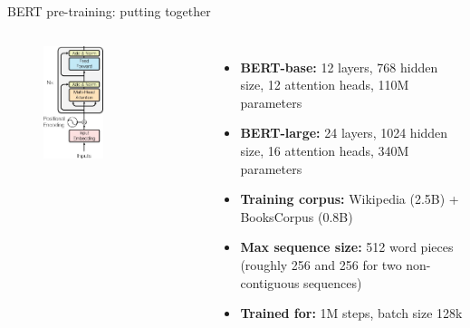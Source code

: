 \documentclass[serif, aspectratio=169]{beamer}
\begin{document}
\begin{frame}{BERT pre-training: putting together}
    \begin{columns}
        \begin{figure}[h]
            \centering
            \includegraphics[width=0.5\textwidth]{Figures/BERT.png}
        \end{figure}
        
        \begin{itemize}
            \item \textbf{BERT-base:} 12 layers, 768 hidden size, 12 attention heads, 110M parameters
            \vspace{0.3cm}
            \item \textbf{BERT-large:} 24 layers, 1024 hidden size, 16 attention heads, 340M parameters
            \vspace{0.3cm}
            \item \textbf{Training corpus:} Wikipedia (2.5B) + BooksCorpus (0.8B)
            \vspace{0.3cm}
            \item \textbf{Max sequence size:} 512 word pieces (roughly 256 and 256 for two non-contiguous sequences)
            \vspace{0.3cm}
            \item \textbf{Trained for:} 1M steps, batch size 128k
        \end{itemize}
    \end{columns}
\end{frame}
\end{document}
